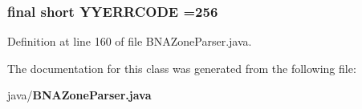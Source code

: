 \subsubsection[{Y\-Y\-E\-R\-R\-C\-O\-D\-E}]{\setlength{\rightskip}{0pt plus 5cm}final short Y\-Y\-E\-R\-R\-C\-O\-D\-E =256\hspace{0.3cm}{\ttfamily [static]}}\label{classorg_1_1smallfoot_1_1parser_1_1zone_1_1BNAZoneParser_a1c58472ea6621d2f613831e08d10dba3}


Definition at line 160 of file B\-N\-A\-Zone\-Parser.\-java.



The documentation for this class was generated from the following file\-:\begin{DoxyCompactItemize}
\item 
java/{\bf B\-N\-A\-Zone\-Parser.\-java}\end{DoxyCompactItemize}
